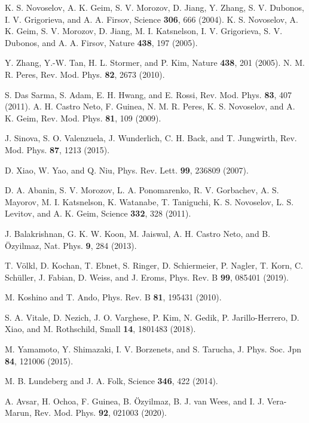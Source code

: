 \documentclass{jpsj3}
\begin{document}
\begin{thebibliography}{99}
K. S. Novoselov, A. K. Geim, S. V. Morozov, D. Jiang, Y. Zhang, S. V. Dubonos, I. V. Grigorieva, and A. A. Firsov, Science {\bf 306}, 666 (2004).
K. S. Novoselov, A. K. Geim, S. V. Morozov, D. Jiang, 
M. I. Katsnelson, 
I. V. Grigorieva, 
S. V. Dubonos, 
and A. A. Firsov, Nature {\bf 438}, 197 (2005).

Y. Zhang, Y.-W. Tan, H. L. Stormer, and P. Kim, 
Nature {\bf 438}, 201 (2005).
N. M. R. Peres, Rev. Mod. Phys. {\bf 82}, 2673 (2010).


S. Das Sarma, S. Adam, E. H. Hwang, and E. Rossi, 
Rev. Mod. Phys.
{\bf 83}, 
407 (2011).
A. H. Castro Neto, F. Guinea, N. M. R. Peres, K. S. Novoselov, and A. K. Geim, 
Rev. Mod. Phys. {\bf 81}, 109 (2009).



J. Sinova, S. O. Valenzuela, J. Wunderlich, C. H. Back, and T. Jungwirth, Rev. Mod. Phys. {\bf 87}, 1213 (2015).

D. Xiao, W. Yao, and Q. Niu, Phys. Rev. Lett. {\bf 99}, 236809 (2007).


D. A. Abanin, 
S. V. Morozov, 
L. A. Ponomarenko, 
R. V. Gorbachev, 
A. S. Mayorov, 
M. I. Katsnelson, 
K. Watanabe, 
T. Taniguchi, 
K. S. Novoselov, 
L. S. Levitov, 
and A. K. Geim, 
Science {\bf 332}, 328 (2011).

J. Balakrishnan, G. K. W. Koon, M. Jaiswal, A. H. Castro Neto, and B. \"{O}zyilmaz, 
Nat. Phys. {\bf 9}, 284 (2013).

T. V\"{o}lkl, D. Kochan, T. Ebnet, S. Ringer, D. Schiermeier, P. Nagler, T. Korn, C. Sch\"{u}ller, J. Fabian, D. Weiss, and J. Eroms, Phys. Rev. B {\bf 99}, 085401 (2019).

M. Koshino and T. Ando, Phys. Rev. B {\bf 81}, 195431 (2010).

S. A. Vitale, 
D. Nezich, 
J. O. Varghese, 
P. Kim, 
N. Gedik, 
P. Jarillo-Herrero, 
D. Xiao, and 
M. Rothschild, Small {\bf 14}, 1801483 (2018).

M. Yamamoto, Y. Shimazaki, I. V. Borzenets, and S. Tarucha, J. Phys. Soc. Jpn {\bf 84}, 121006 (2015).

M. B. Lundeberg and J. A. Folk, Science {\bf 346}, 422 (2014).


A. Avsar, H. Ochoa, F. Guinea, B. \"{O}zyilmaz, B. J. van Wees, and I. J. Vera-Marun, Rev. Mod. Phys. {\bf 92}, 021003 (2020).


\end{thebibliography}
\end{document}
